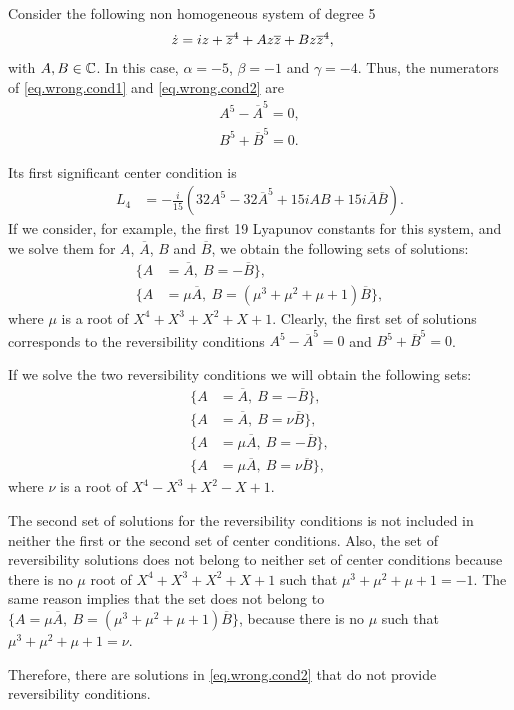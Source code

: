 Consider the following non homogeneous system of degree 5
\begin{align}
\dot z &= iz + \overline{z}^4 + Az\overline{z} + Bz\overline{z}^4,
\label{eq.system.exemple}
\end{align}
with $A,B\in\mathbb{C}$.  In this case, $\alpha=-5$, $\beta=-1$ and $\gamma=-4$. Thus, the numerators of \eqref{eq.wrong.cond1} and \eqref{eq.wrong.cond2} are
\begin{align*}
A^5-\overline A^5=0,\\
B^5+\overline B^5=0.
\end{align*}


Its first significant center condition is
\begin{align}
L_4 &= -\frac{i}{15}(32A^5-32\overline{A}^5+15iAB+15i\overline{A}\overline{B}).
\end{align}
If we consider, for example, the first 19 Lyapunov constants for this system, and we solve them for $A$, $\overline A$, $B$ and $\overline B$, we obtain the following sets of solutions:
\begin{align*}
\{A&=\overline A, ~B=-\overline B\},\\
\{A&=\mu\overline A, ~B=(\mu^3+\mu^2+\mu+1)\overline B\},
\end{align*}
where $\mu$ is a root of $X^4+X^3+X^2+X+1$. Clearly, the first set of solutions corresponds to the reversibility conditions $A^5-\overline A^5=0$ and $B^5+\overline B^5=0$.

If we solve the two reversibility conditions we will obtain the following sets:
\begin{align*}
\{A&=\overline A, ~B=-\overline B\},\\
\{A&=\overline A, ~B=\nu\overline B\},\\
\{A&=\mu\overline A, ~B=-\overline B\},\\
\{A&=\mu\overline A, ~B=\nu\overline B\},
\end{align*}
where $\nu$ is a root of $X^4-X^3+X^2-X+1$.

The second set of solutions for the reversibility conditions is not included in neither the first or the second set of center conditions. Also, the  set of reversibility solutions does not belong to neither set of center conditions because there is no $\mu$ root of $X^4+X^3+X^2+X+1$ such that $\mu^3+\mu^2+\mu+1=-1$. The same reason implies that the  set does not belong to $\{A=\mu\overline A, ~B=(\mu^3+\mu^2+\mu+1)\overline B\}$, because there is no $\mu$ such that $\mu^3+\mu^2+\mu+1=\nu$.

Therefore, there are solutions in \eqref{eq.wrong.cond2} that do not provide reversibility conditions.


